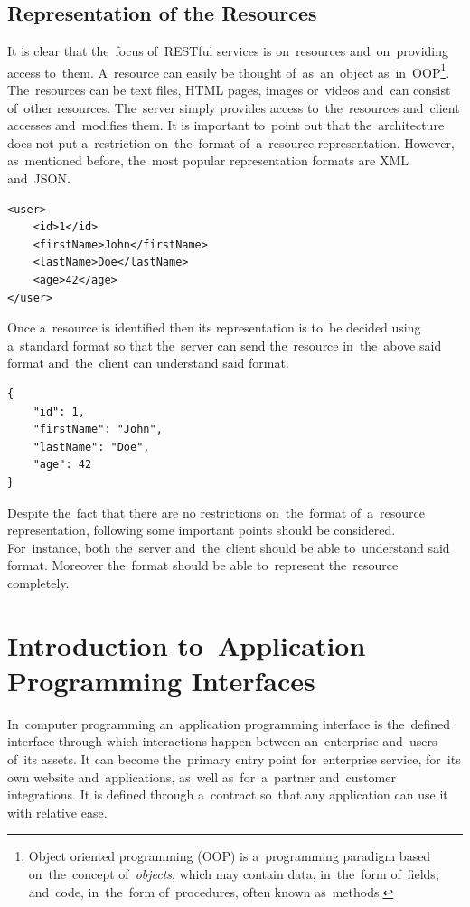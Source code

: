 \subsection{Representation of the Resources}
It is clear that the~focus of~RESTful services is on~resources and~on~providing
access to~them. A~resource can easily be thought of~as~an~object
as~in~OOP\footnote{Object oriented programming (OOP) is a~programming paradigm
based on~the~concept of~\textit{objects}, which may contain data, in~the~form
of~fields; and~code, in~the~form of~procedures, often known as~methods.}.
The~resources can be text files, HTML pages, images or~videos and~can consist
of~other resources. The~server simply provides access to~the~resources
and~client accesses and~modifies them. It is important to~point out that
the~architecture does not put a~restriction on~the~format of~a~resource
representation. However, as~mentioned before, the~most popular representation
formats are XML and~JSON.

\vspace{1mm}
\begin{lstlisting}[caption=An~example of~a~XML representation
of~a~\textit{user} resource., label=lst-XMLExample, style=dp-xml]
<user>
	<id>1</id>
	<firstName>John</firstName>
	<lastName>Doe</lastName>
	<age>42</age>
</user>
\end{lstlisting}

Once a~resource is identified then its representation is to~be decided using
a~standard format so that the~server can send the~resource in~the~above said
format and~the~client can understand said format.

\vspace{1mm}
\begin{lstlisting}[caption=An~example of~a~JSON representation
of~a~\textit{user} resource., label=lst-JSONExample, style=dp-default]
{
	"id": 1,
	"firstName": "John",
	"lastName": "Doe",
	"age": 42
}
\end{lstlisting}

Despite the~fact that there are no restrictions on~the~format of~a~resource
representation, following some important points should be considered.
For~instance, both the~server and~the~client should be able to~understand said
format. Moreover the~format should be able to~represent the~resource completely.



\section{Introduction to~Application Programming Interfaces}
In~computer programming an~application programming interface is the~defined
interface through which interactions happen between an~enterprise and~users
of~its assets. It can become the~primary entry point for~enterprise service,
for~its own website and~applications, as~well as~for~a~partner and~customer
integrations. It is defined through a~contract so~that any application can use
it with relative ease. 

